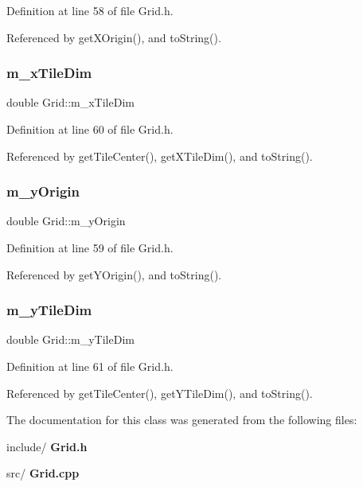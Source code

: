 Definition at line 58 of file Grid.\+h.



Referenced by get\+X\+Origin(), and to\+String().

\mbox{\label{class_grid_a48c3d1fc34a14bff8b9176558a8b6f4e}} 
\subsubsection{m\_xTileDim}
{\footnotesize\ttfamily double Grid\+::m\+\_\+x\+Tile\+Dim\hspace{0.3cm}{\ttfamily [private]}}



Definition at line 60 of file Grid.\+h.



Referenced by get\+Tile\+Center(), get\+X\+Tile\+Dim(), and to\+String().

\mbox{\label{class_grid_a16b2fc5a6e96ad2d59d59b52db83f4aa}} 
\subsubsection{m\_yOrigin}
{\footnotesize\ttfamily double Grid\+::m\+\_\+y\+Origin\hspace{0.3cm}{\ttfamily [private]}}



Definition at line 59 of file Grid.\+h.



Referenced by get\+Y\+Origin(), and to\+String().

\mbox{\label{class_grid_a497eeffc4a16a021e15ecbc130f4f644}} 
\subsubsection{m\_yTileDim}
{\footnotesize\ttfamily double Grid\+::m\+\_\+y\+Tile\+Dim\hspace{0.3cm}{\ttfamily [private]}}



Definition at line 61 of file Grid.\+h.



Referenced by get\+Tile\+Center(), get\+Y\+Tile\+Dim(), and to\+String().



The documentation for this class was generated from the following files\+:\begin{DoxyCompactItemize}
\item 
include/\textbf{ Grid.\+h}\item 
src/\textbf{ Grid.\+cpp}\end{DoxyCompactItemize}
